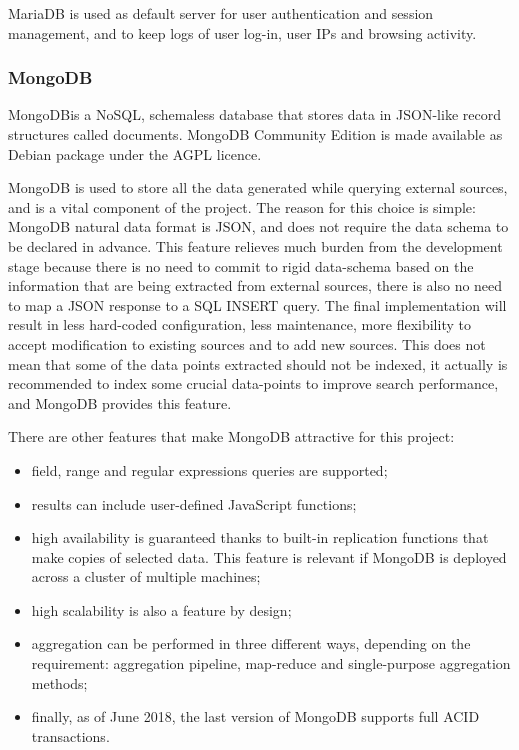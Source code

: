 MariaDB is used as default server for user authentication and session
management, and to keep logs of user log-in, user IPs and browsing activity.


\subsubsection{MongoDB}

MongoDB\texttrademark is a NoSQL, schemaless database that stores data in
JSON-like record structures called documents. MongoDB Community Edition is made
available as Debian package under the AGPL licence.

MongoDB is used to store all the data generated while querying external
sources, and is a vital component of the project. The reason for this choice is
simple: MongoDB natural data format is JSON, and does not require the
data schema to be declared in advance. This feature relieves much burden from
the development stage because there is no need to commit to rigid data-schema
based on the information that are being extracted from external sources, there is
also no need to map a JSON response to a SQL INSERT query. The final
implementation will result in less hard-coded configuration, less maintenance,
more flexibility to accept modification to existing sources and to add new
sources. This does not mean that some of the data points extracted should not be
indexed, it actually is recommended to index some crucial data-points to improve
search performance, and MongoDB provides this feature.

There are other features that make MongoDB attractive for this project:
\begin{itemize}
  \item field, range and regular expressions queries are supported;
  \item results can include user-defined JavaScript functions;
  \item high availability is guaranteed thanks to built-in replication functions
  that make copies of selected data. This feature is relevant if MongoDB is
  deployed across a cluster of multiple machines;
  \item high scalability is also a feature by design;
  \item aggregation can be performed in three different ways, depending on the
  requirement: aggregation pipeline, map-reduce and single-purpose aggregation
  methods;
  \item finally, as of June 2018, the last version of MongoDB supports full ACID
  transactions.
\end{itemize}

